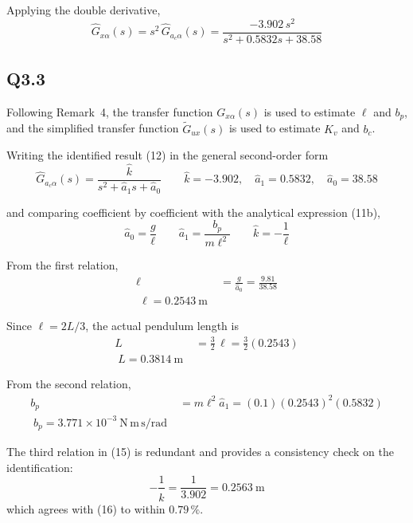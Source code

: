\documentclass[11pt,a4paper]{article}
\begin{document}
Applying the double derivative,
\begin{equation*}
	\hat{G}_{x\alpha}(s) = s^{2}\,\hat{G}_{a_{c}\alpha}(s)
	= \frac{-3.902\, s^{2}}{s^{2} + 0.5832 s + 38.58} \tag{13}
\end{equation*}

\subsection*{Q3.3}

Following Remark~4, the transfer function $G_{x\alpha}(s)$ is used to
estimate $\ell$ and $b_{p}$, and the simplified transfer function
$\tilde{G}_{ux}(s)$ is used to estimate $K_{v}$ and $b_{c}$.

Writing the identified result (12) in the general second-order form
\begin{equation*}
	\hat{G}_{a_{c}\alpha}(s) = \frac{\hat{k}}{s^{2} + \hat{a}_{1} s
	+ \hat{a}_{0}}
	\qquad
	\hat{k} = -3.902, \quad \hat{a}_{1} = 0.5832, \quad \hat{a}_{0} = 38.58
	\tag{14}
\end{equation*}

and comparing coefficient by coefficient with the analytical expression
(11b),
\begin{equation*}
	\hat{a}_{0} = \frac{g}{\ell}
	\qquad
	\hat{a}_{1} = \frac{b_{p}}{m \ell^{2}}
	\qquad
	\hat{k} = -\frac{1}{\ell}
	\tag{15}
\end{equation*}

From the first relation,
\begin{align*}
	\ell &= \frac{g}{\hat{a}_{0}} = \frac{9.81}{38.58} \\
	\boxed{\; \ell = 0.2543~\mathrm{m} \;} \tag{16}
\end{align*}

Since $\ell = 2L/3$, the actual pendulum length is
\begin{align*}
	L &= \frac{3}{2}\,\ell = \frac{3}{2}\left( 0.2543 \right) \\
	\boxed{\; L = 0.3814~\mathrm{m} \;} \tag{17}
\end{align*}

From the second relation,
\begin{align*}
	b_{p} &= m \ell^{2} \hat{a}_{1}
	= \left( 0.1 \right)\left( 0.2543 \right)^{2}\left( 0.5832 \right) \\
	\boxed{\; b_{p} = 3.771 \times 10^{-3}~\mathrm{N\,m\,s/rad} \;} \tag{18}
\end{align*}

The third relation in (15) is redundant and provides a consistency check on
the identification:
\begin{equation*}
	-\frac{1}{\hat{k}} = \frac{1}{3.902} = 0.2563~\mathrm{m} \tag{19}
\end{equation*}
which agrees with (16) to within $0.79\,\%$.
\end{document}
